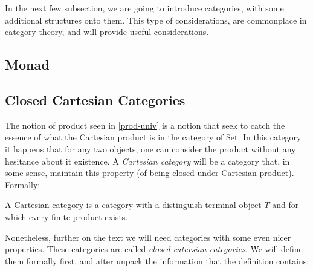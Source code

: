   In the next few subsection, we are going to introduce categories, with some additional structures onto them. This type of considerations, are commonplace in category theory, and will provide useful considerations.

  \subsection{Monad}
  


  \subsection{Closed Cartesian Categories}

  The notion of product seen in \ref{prod-univ} is a notion that seek to catch the essence of what the Cartesian product is in the category of Set. In this category it happens that for any two objects, one can consider the product without any hesitance about it existence. A \emph{Cartesian category} will be a category that, in some sense, maintain this property (of being closed under Cartesian product). Formally: 
  \begin{definition}
    A Cartesian category is a category with a distinguish terminal object $T$ and for which every finite product exists.
  \end{definition}

Nonetheless, further on the text we will need categories with some even nicer properties. These categories are called \emph{closed catersian categories}. We will define them formally first, and after unpack the information that the definition contains:
  
